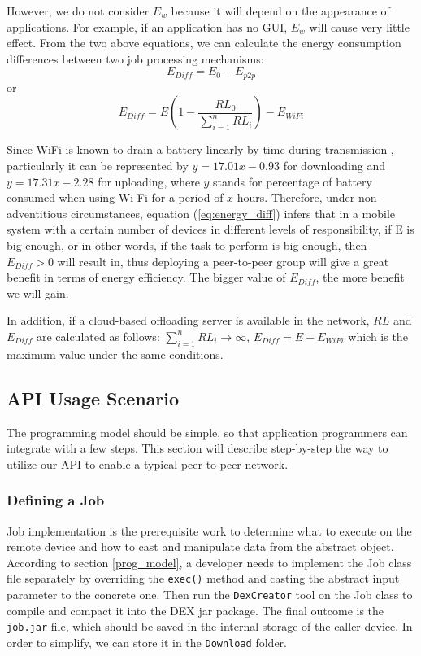 \documentclass{sig-alternate}[10pt]
\begin{document}
However, we do not consider $E_{w}$ because it will depend on the appearance of applications. For example, if an application has no GUI, $E_{w}$ will cause very little effect. From the two above equations, we can calculate the energy consumption differences between two job processing mechanisms:
$$E_{Diff} = E_{0} - E_{p2p}$$ 
or 
\begin{equation}
\label{eq:energy_diff}
E_{Diff} = E(1 - \frac{RL_{0}}{\sum_{i=1}^{n}{RL_{i}}}) - E_{WiFi}
\end{equation}

Since WiFi is known to drain a battery linearly by time during transmission \cite{wifi_energy}, particularly it can be represented by $y = 17.01x - 0.93$ for downloading and $y = 17.31x - 2.28$ for uploading, where $y$ stands for percentage of battery consumed when using Wi-Fi for a period of $x$ hours. Therefore, under non-adventitious circumstances, equation (\ref{eq:energy_diff}) infers that in a mobile system with a certain number of devices in different levels of responsibility, if E is big enough, or in other words, if the task to perform is big enough, then $E_{Diff} > 0$ will result in, thus deploying a peer-to-peer group will give a great benefit in terms of energy efficiency. The bigger value of $E_{Diff}$, the more benefit we will gain. 

In addition, if a cloud-based offloading server is available in the network, $RL$ and $E_{Diff}$ are calculated as follows: $\sum_{i=1}^{n}{RL_{i}} \rightarrow \infty$, $E_{Diff} = E - E_{WiFi}$ which is the maximum value under the same conditions.

\subsection{API Usage Scenario}
The programming model should be simple, so that application programmers can integrate with a few steps. This section will describe step-by-step the way to utilize our API to enable a typical peer-to-peer network.

\subsubsection{Defining a Job}
Job implementation is the prerequisite work to determine what to execute on the remote device and how to cast and manipulate data from the abstract object. According to section \ref{prog_model}, a developer needs to implement the Job class file separately by overriding the \texttt{exec()} method and casting the abstract input parameter to the concrete one. Then run the \texttt{DexCreator} tool on the Job class to compile and compact it into the DEX jar package. The final outcome is the \texttt{job.jar} file, which should be saved in the internal storage of the caller device. In order to simplify, we can store it in the \texttt{Download} folder.  
\end{document}
